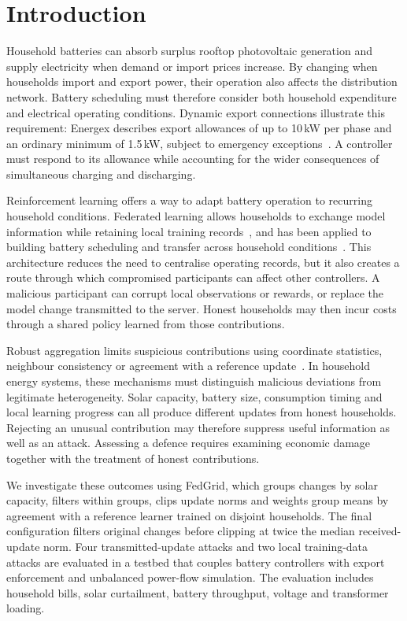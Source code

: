 \section{Introduction}
\label{sec:introduction}
Household batteries can absorb surplus rooftop photovoltaic generation and supply electricity when demand or import prices increase. By changing when households import and export power, their operation also affects the distribution network. Battery scheduling must therefore consider both household expenditure and electrical operating conditions. Dynamic export connections illustrate this requirement: Energex describes export allowances of up to 10\,kW per phase and an ordinary minimum of 1.5\,kW, subject to emergency exceptions~\cite{energex}. A controller must respond to its allowance while accounting for the wider consequences of simultaneous charging and discharging.

Reinforcement learning offers a way to adapt battery operation to recurring household conditions. Federated learning allows households to exchange model information while retaining local training records~\cite{fedavg}, and has been applied to building battery scheduling and transfer across household conditions~\cite{sievers}. This architecture reduces the need to centralise operating records, but it also creates a route through which compromised participants can affect other controllers. A malicious participant can corrupt local observations or rewards, or replace the model change transmitted to the server. Honest households may then incur costs through a shared policy learned from those contributions.

Robust aggregation limits suspicious contributions using coordinate statistics, neighbour consistency or agreement with a reference update~\cite{yin,krum,fltrust}. In household energy systems, these mechanisms must distinguish malicious deviations from legitimate heterogeneity. Solar capacity, battery size, consumption timing and local learning progress can all produce different updates from honest households. Rejecting an unusual contribution may therefore suppress useful information as well as an attack. Assessing a defence requires examining economic damage together with the treatment of honest contributions.

We investigate these outcomes using FedGrid, which groups changes by solar capacity, filters within groups, clips update norms and weights group means by agreement with a reference learner trained on disjoint households. The final configuration filters original changes before clipping at twice the median received-update norm. Four transmitted-update attacks and two local training-data attacks are evaluated in a testbed that couples battery controllers with export enforcement and unbalanced power-flow simulation. The evaluation includes household bills, solar curtailment, battery throughput, voltage and transformer loading.

